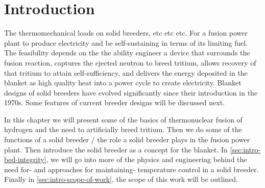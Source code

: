 \chapter{Introduction} \label{sec:introduction}
The thermomechanical loads on solid breeders, etc etc etc. For a fusion power plant to produce electricity and be self-sustaining in terms of its limiting fuel. The feasibility depends on the the ability engineer a device that surrounds the fusion reaction, captures the ejected neutron to breed tritium, allows recovery of that tritium to attain self-sufficiency, and delivers the energy deposited in the blanket as high quality heat into a power cycle to create electricity. Blanket designs of solid breeders have evolved significantly since their introduction in the 1970s. Some features of current breeder designs will be discussed next.

In this chapter we will present some of the basics of thermonuclear fusion of hydrogen and the need to artificially breed tritium.  Then we do some of the functions of a solid breeder / the role a solid breeder plays in the fusion power plant. Then introduce the solid breeder as a concept for the blanket. In \cref{sec:intro-bed-integrity}, we will go into more of the physics and engineering behind the need for- and approaches for maintaining- temperature control in a solid breeder. Finally in \cref{sec:intro-scope-of-work}, the scope of this work will be outlined.











